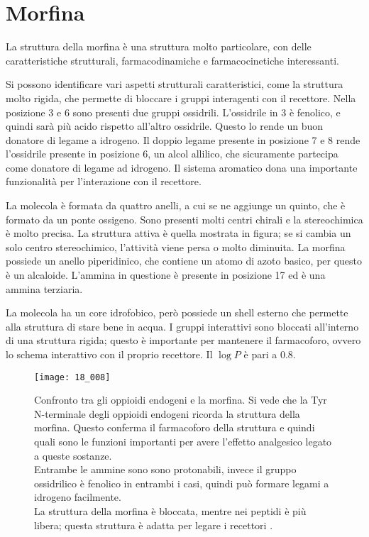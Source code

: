 \section{Morfina}

La struttura della morfina è una struttura molto particolare, con delle
caratteristiche strutturali, farmacodinamiche e farmacocinetiche
interessanti.


Si possono identificare vari aspetti strutturali caratteristici, come la
struttura molto rigida, che permette di bloccare i gruppi interagenti
con il recettore.
Nella posizione 3 e 6 sono presenti due gruppi ossidrili. L'ossidrile in
3 è fenolico, e quindi sarà più acido rispetto all'altro ossidrile.
Questo lo rende un buon donatore di legame a idrogeno.
Il doppio legame presente in posizione 7 e 8 rende l'ossidrile presente
in posizione 6, un alcol allilico, che sicuramente partecipa come
donatore di legame ad idrogeno.
Il sistema aromatico dona una importante funzionalità per l'interazione
con il recettore.

La molecola è formata da quattro anelli, a cui se ne aggiunge un quinto,
che è formato da un ponte ossigeno.
Sono presenti molti centri chirali e la stereochimica è molto precisa.
La struttura attiva è quella mostrata in figura; se si cambia un solo
centro stereochimico, l'attività viene persa o molto diminuita.
La morfina possiede un anello piperidinico, che contiene un atomo di
azoto basico, per questo è un alcaloide. L'ammina in questione è
presente in posizione 17 ed è una ammina terziaria.

La molecola ha un core idrofobico, però possiede un shell esterno che
permette alla struttura di stare bene in acqua. I gruppi interattivi
sono bloccati all'interno di una struttura rigida; questo è importante
per mantenere il farmacoforo, ovvero lo schema interattivo con il
proprio recettore. Il \(\log{} P\) è pari a 0.8.


\begin{figure}[H]
  \texttt{[image: 18\_008]}
  \caption{Confronto tra gli oppioidi endogeni e la morfina. Si vede che
  la Tyr N-terminale degli oppioidi endogeni ricorda la struttura della
  morfina. Questo conferma il farmacoforo della struttura e quindi quali
  sono le funzioni importanti per avere l'effetto analgesico legato a
  queste sostanze.\\
  Entrambe le ammine sono sono protonabili, invece il gruppo ossidrilico è
  fenolico in entrambi i casi, quindi può formare legami a idrogeno
  facilmente.\\
  La struttura della morfina è bloccata, mentre nei peptidi è più libera;
  questa struttura è adatta per legare i recettori \mu.}
\end{figure}

